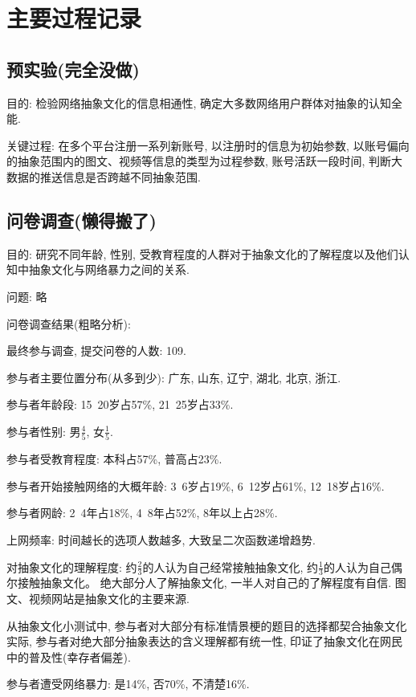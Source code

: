 \documentclass[12pt,a4paper]{ctexart}
\begin{document}

\section{主要过程记录}

\subsection{预实验(完全没做)}

目的: 检验网络抽象文化的信息相通性, 确定大多数网络用户群体对抽象的认知全能.

关键过程: 在多个平台注册一系列新账号, 以注册时的信息为初始参数, 以账号偏向的抽象范围内的图文、视频等信息的类型为过程参数, 账号活跃一段时间, 判断大数据的推送信息是否跨越不同抽象范围.

\subsection{问卷调查(懒得搬了)}

目的: 研究不同年龄, 性别, 受教育程度的人群对于抽象文化的了解程度以及他们认知中抽象文化与网络暴力之间的关系.

问题: 略

问卷调查结果(粗略分析):

最终参与调查, 提交问卷的人数: 109.

参与者主要位置分布(从多到少): 广东, 山东, 辽宁, 湖北, 北京, 浙江.

参与者年龄段: 15~20岁占57\%, 21~25岁占33\%.

参与者性别: 男$\frac{4}{5}$, 女$\frac{1}{5}$.

参与者受教育程度: 本科占57\%, 普高占23\%.

参与者开始接触网络的大概年龄: 3~6岁占19\%, 6~12岁占61\%, 12~18岁占16\%.

参与者网龄: 2~4年占18\%, 4~8年占52\%, 8年以上占28\%.

上网频率: 时间越长的选项人数越多, 大致呈二次函数递增趋势.

对抽象文化的理解程度: 约$\frac{2}{3}$的人认为自己经常接触抽象文化, 约$\frac{1}{3}$的人认为自己偶尔接触抽象文化。
绝大部分人了解抽象文化, 一半人对自己的了解程度有自信.
图文、视频网站是抽象文化的主要来源.

从抽象文化小测试中, 参与者对大部分有标准情景梗的题目的选择都契合抽象文化实际, 参与者对绝大部分抽象表达的含义理解都有统一性, 印证了抽象文化在网民中的普及性(幸存者偏差).

参与者遭受网络暴力: 是14\%, 否70\%, 不清楚16\%.
\end{document}
